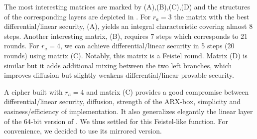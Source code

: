 The most interesting matrices are marked by (A),(B),(C),(D) and the structures of the corresponding layers are depicted in . For $r_a = 3$ the matrix with the best differential/linear security, (A),  yields an integral characteristic covering almost 8 steps. Another interesting matrix, (B), requires 7 steps which corresponds to 21 rounds. For $r_a = 4$, we can achieve differential/linear security in 5 steps (20 rounds) using matrix (C). Notably, this matrix is a Feistel round. Matrix (D) is similar but it adds additional mixing between the two left branches, which improves diffusion but slightly weakens differential/linear provable security.

A cipher built with $r_a = 4$ and matrix (C) provides a good compromise between differential/linear security, diffusion, strength of the ARX-box, simplicity and easiness/efficiency of implementation. It also generalizes elegantly the linear layer of the 64-bit version of \sparx{}. We thus settled for this Feistel-like function. For convenience, we decided to use its mirrored version.

